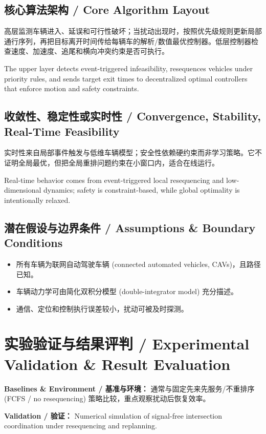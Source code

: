 \documentclass[UTF8,a4paper,11pt,fontset=fandol]{ctexart}
\begin{document}
\subsection{核心算法架构 / Core Algorithm Layout}
高层监测车辆进入、延误和可行性破坏；当扰动出现时，按照优先级规则更新局部通行序列，再把目标离开时间传给每辆车的解析/数值最优控制器。低层控制器检查速度、加速度、追尾和横向冲突约束是否可执行。

The upper layer detects event-triggered infeasibility, resequences vehicles under priority rules, and sends target exit times to decentralized optimal controllers that enforce motion and safety constraints.

\subsection{收敛性、稳定性或实时性 / Convergence, Stability, Real-Time Feasibility}
实时性来自局部事件触发与低维车辆模型；安全性依赖硬约束而非学习策略。它不证明全局最优，但把全局重排问题约束在小窗口内，适合在线运行。

Real-time behavior comes from event-triggered local resequencing and low-dimensional dynamics; safety is constraint-based, while global optimality is intentionally relaxed.

\subsection{潜在假设与边界条件 / Assumptions \& Boundary Conditions}
\begin{itemize}
\item 所有车辆为联网自动驾驶车辆 (connected automated vehicles, CAVs)，且路径已知。
\item 车辆动力学可由简化双积分模型 (double-integrator model) 充分描述。
\item 通信、定位和控制执行误差较小，扰动可被及时探测。
\end{itemize}


\section{实验验证与结果评判 / Experimental Validation \& Result Evaluation}
\textbf{Baselines \& Environment / 基准与环境：} 通常与固定先来先服务/不重排序 (FCFS / no resequencing) 策略比较，重点观察扰动后恢复效率。

\textbf{Validation / 验证：} Numerical simulation of signal-free intersection coordination under resequencing and replanning.
\end{document}
